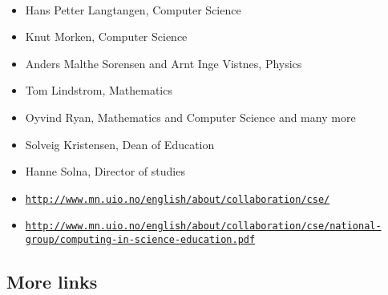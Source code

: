 \documentclass[%
twoside,                 %
final,                   %
10pt]{article}
\begin{document}
\paragraph{}
\begin{itemize}
\item Hans Petter Langtangen, Computer Science

\item Knut Morken, Computer Science

\item Anders Malthe Sorensen and Arnt Inge Vistnes, Physics

\item Tom Lindstrom, Mathematics

\item Oyvind Ryan, Mathematics and Computer Science and many more

\item Solveig Kristensen, Dean of Education

\item Hanne Solna, Director of studies

\item \href{{http://www.mn.uio.no/english/about/collaboration/cse/}}{\nolinkurl{http://www.mn.uio.no/english/about/collaboration/cse/}}

\item \href{{http://www.mn.uio.no/english/about/collaboration/cse/national-group/computing-in-science-education.pdf}}{\nolinkurl{http://www.mn.uio.no/english/about/collaboration/cse/national-group/computing-in-science-education.pdf}}
\end{itemize}

\noindent




\subsection{More links}

\end{document}
